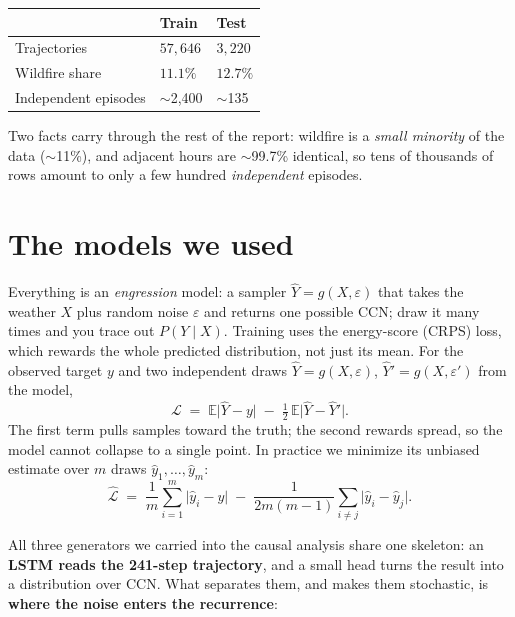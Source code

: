 \documentclass[11pt]{article}
\begin{document}
\begin{center}
\begin{tabular}{lll}
\toprule
& \textbf{Train} & \textbf{Test} \\
\midrule
Trajectories        & $57{,}646$ & $3{,}220$ \\
Wildfire share      & $11.1\%$   & $12.7\%$ \\
Independent episodes & $\sim$2{,}400 & $\sim$135 \\
\bottomrule
\end{tabular}
\end{center}

Two facts carry through the rest of the report: wildfire is a \emph{small minority} of the
data ($\sim$11\%), and adjacent hours are $\sim$99.7\% identical, so tens of thousands of
rows amount to only a few hundred \emph{independent} episodes.

\section*{The models we used}
Everything is an \emph{engression} model: a sampler $\widehat{Y}=g(X,\varepsilon)$ that
takes the weather $X$ plus random noise $\varepsilon$ and returns one possible CCN; draw
it many times and you trace out $P(Y\mid X)$. Training uses the energy-score (CRPS) loss,
which rewards the whole predicted distribution, not just its mean. For the observed
target $y$ and two independent draws $\widehat{Y}=g(X,\varepsilon)$,
$\widehat{Y}'=g(X,\varepsilon')$ from the model,
\[
  \mathcal{L} \;=\; \mathbb{E}\big|\widehat{Y}-y\big|
  \;-\; \tfrac{1}{2}\,\mathbb{E}\big|\widehat{Y}-\widehat{Y}'\big|.
\]
The first term pulls samples toward the truth; the second rewards spread, so the model
cannot collapse to a single point. In practice we minimize its unbiased estimate over $m$
draws $\widehat{y}_1,\dots,\widehat{y}_m$:
\[
  \widehat{\mathcal{L}} \;=\; \frac{1}{m}\sum_{i=1}^{m}\big|\widehat{y}_i-y\big|
  \;-\; \frac{1}{2m(m-1)}\sum_{i\neq j}\big|\widehat{y}_i-\widehat{y}_j\big|.
\]

All three generators we carried into the causal analysis share one skeleton: an
\textbf{LSTM reads the 241-step trajectory}, and a small head turns the result into a
distribution over CCN. What separates them, and makes them stochastic, is
\textbf{where the noise enters the recurrence}:
\end{document}
